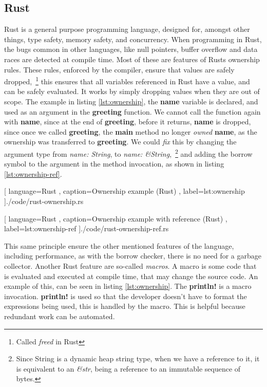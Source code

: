 \subsection{Rust}

Rust is a general purpose programming language, designed for, amongst other
things, type safety, memory safety, and concurrency. When programming in Rust,
the bugs common in other languages, like null pointers, buffer overflow and data
races are detected at compile time. Most of these are features of Rusts
ownership rules. These rules, enforced by the compiler, ensure that values are
safely dropped,~\footnote{Called \textit{freed} in Rust} this ensures that all
variables referenced in Rust have a value, and can be safely evaluated. It works
by simply dropping values when they are out of scope. The example in listing
\ref{lst:ownership}, the \textbf{name} variable is declared, and used as an
argument in the \textbf{greeting} function. We cannot call the function again
with \textbf{name}, since at the end of \textbf{greeting}, before it returns,
\textbf{name} is dropped, since once we called \textbf{greeting}, the
\textbf{main} method no longer \textit{owned} \textbf{name}, as the ownership
was transferred to \textbf{greeting}. We could \textit{fix} this by changing the
argument type from \textit{name: String}, to \textit{name: \&String},~\footnote{Since String is a dynamic heap string type, when we have a reference to it, it is equivalent to an \textit{\&str}, being a reference to an immutable sequence of bytes.}
and adding the borrow symbol to the argument in
the method invocation, as shown in listing \ref{lst:ownership-ref}.

\begin{center}
  
    [ language=Rust
    , caption={Ownership example (Rust)}
    , label=lst:ownership
    ]{./code/rust-ownership.rs}
\end{center}

\begin{center}
  
    [ language=Rust
    , caption={Ownership example with reference (Rust)}
    , label=lst:ownership-ref
    ]{./code/rust-ownership-ref.rs}
\end{center}

This same principle ensure the other mentioned features of the language,
including performance, as with the borrow checker, there is no need for a
garbage collector. Another Rust feature are so-called \textit{macros}. A macro
is some code that is evaluated and executed at compile time, that may change
the source code. An example of this, can be seen in listing \ref{lst:ownership}.
The \textbf{println!} is a macro invocation. \textbf{println!} is used so that
the developer doesn't have to format the expressions being used, this is handled
by the macro. This is helpful because redundant work can be automated.

